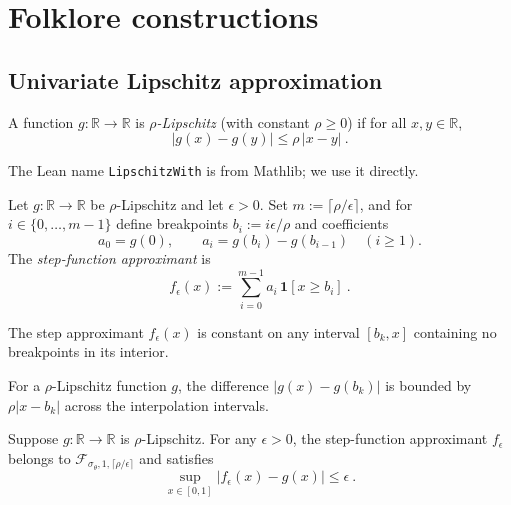 \section{Folklore constructions}\label{sec:folklore}

\subsection{Univariate Lipschitz approximation}

\begin{definition}\label{def:lipschitz}
A function $g : \mathbb{R} \to \mathbb{R}$ is \emph{$\rho$-Lipschitz} (with constant $\rho \ge 0$) if for all $x, y \in \mathbb{R}$,
\[
  |g(x) - g(y)| \le \rho \, |x - y|
  \: .
\]
\end{definition}

\begin{remark}
  The Lean name \texttt{LipschitzWith} is from Mathlib; we use it directly.
\end{remark}

\begin{definition}\label{def:stepApprox}
Let $g : \mathbb{R} \to \mathbb{R}$ be $\rho$-Lipschitz and let $\epsilon > 0$.
Set $m := \lceil \rho / \epsilon \rceil$, and for $i \in \{0, \ldots, m-1\}$ define breakpoints $b_i := i \epsilon / \rho$ and coefficients
\[
  a_0 = g(0), \qquad a_i = g(b_i) - g(b_{i-1}) \quad (i \ge 1).
\]
The \emph{step-function approximant} is
\[
  f_{\epsilon}(x) := \sum_{i=0}^{m-1} a_i \, \mathbf{1}[x \ge b_i]
  \: .
\]
\end{definition}

\begin{lemma}\label{lem:stepApproxCollapse}
The step approximant $f_\epsilon(x)$ is constant on any interval $[b_k, x]$ containing no breakpoints in its interior.
\end{lemma}

\begin{lemma}\label{lem:absGBreakpointSubLe}
For a $\rho$-Lipschitz function $g$, the difference $|g(x) - g(b_k)|$ is bounded by $\rho |x - b_k|$ across the interpolation intervals.
\end{lemma}

\begin{proposition}\label{prop:univariateFolklore}
Suppose $g : \mathbb{R} \to \mathbb{R}$ is $\rho$-Lipschitz.
For any $\epsilon > 0$, the step-function approximant $f_\epsilon$ belongs to $\mathcal{F}_{\sigma_\theta, 1, \lceil \rho/\epsilon \rceil}$ and satisfies
\[
  \sup_{x \in [0,1]} |f_\epsilon(x) - g(x)| \le \epsilon
  \: .
\]
\end{proposition}

